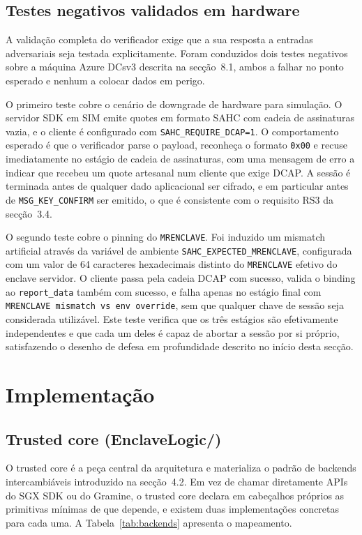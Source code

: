 \subsection{Testes negativos validados em hardware}

A validação completa do verificador exige que a sua resposta a entradas adversariais seja testada explicitamente. Foram conduzidos dois testes negativos sobre a máquina Azure DCsv3 descrita na secção~8.1, ambos a falhar no ponto esperado e nenhum a colocar dados em perigo.

O primeiro teste cobre o cenário de downgrade de hardware para simulação. O servidor SDK em SIM emite quotes em formato SAHC com cadeia de assinaturas vazia, e o cliente é configurado com \texttt{SAHC\_REQUIRE\_DCAP=1}. O comportamento esperado é que o verificador parse o payload, reconheça o formato \texttt{0x00} e recuse imediatamente no estágio de cadeia de assinaturas, com uma mensagem de erro a indicar que recebeu um quote artesanal num cliente que exige DCAP. A sessão é terminada antes de qualquer dado aplicacional ser cifrado, e em particular antes de \texttt{MSG\_KEY\_CONFIRM} ser emitido, o que é consistente com o requisito RS3 da secção~3.4.

O segundo teste cobre o pinning do \texttt{MRENCLAVE}. Foi induzido um mismatch artificial através da variável de ambiente \texttt{SAHC\_EXPECTED\_MRENCLAVE}, configurada com um valor de 64 caracteres hexadecimais distinto do \texttt{MRENCLAVE} efetivo do enclave servidor. O cliente passa pela cadeia DCAP com sucesso, valida o binding ao \texttt{report\_data} também com sucesso, e falha apenas no estágio final com \texttt{MRENCLAVE mismatch vs env override}, sem que qualquer chave de sessão seja considerada utilizável. Este teste verifica que os três estágios são efetivamente independentes e que cada um deles é capaz de abortar a sessão por si próprio, satisfazendo o desenho de defesa em profundidade descrito no início desta secção.

\section{Implementação}

\subsection{Trusted core (EnclaveLogic/)}

O trusted core é a peça central da arquitetura e materializa o padrão de backends intercambiáveis introduzido na secção~4.2. Em vez de chamar diretamente APIs do SGX SDK ou do Gramine, o trusted core declara em cabeçalhos próprios as primitivas mínimas de que depende, e existem duas implementações concretas para cada uma. A Tabela~\ref{tab:backends} apresenta o mapeamento.

